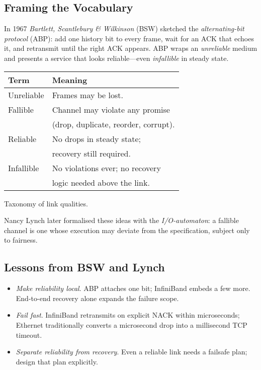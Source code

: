 \documentclass[../../../OAE-SPEC-MAIN.tex]{subfiles}
\begin{document}


\subsection{Framing the Vocabulary}

In 1967 \emph{Bartlett, Scantlebury \& Wilkinson} (BSW) sketched the
\emph{alternating-bit protocol} (ABP): add one history bit to every frame,
wait for an ACK that echoes it, and retransmit until the right ACK appears.
ABP wraps an \emph{unreliable} medium and presents a service that looks
reliable---even \emph{infallible} in steady state.

\begin{marginfigure}
  \footnotesize
  \centering
  \begin{tabular}{@{}l@{~}l@{}}
    \toprule
    Term & Meaning\\
    \midrule
    Unreliable & Frames may be lost.\\
    Fallible   & Channel may violate any promise\\
               & (drop, duplicate, reorder, corrupt).\\
    Reliable   & No drops in steady state;\\
               & recovery still required.\\
    Infallible & No violations ever; no recovery\\
               & logic needed above the link.\\
    \bottomrule
  \end{tabular}
  \caption{Taxonomy of link qualities.\label{tab:taxonomy}}
\end{marginfigure}

Nancy Lynch later formalised these ideas with the
\emph{I/O-automaton}: a fallible channel is one whose execution may
deviate from the specification, subject only to fairness.


\subsection{Lessons from BSW and Lynch}

\begin{itemize}
\item \emph{Make reliability local}.  ABP attaches one bit; InfiniBand embeds
      a few more.  End-to-end recovery alone expands the failure scope.
\item \emph{Fail fast}.  InfiniBand retransmits on explicit NACK within
      microseconds; Ethernet traditionally converts a microsecond drop into a
      millisecond TCP timeout.
\item \emph{Separate reliability from recovery}.  Even a reliable link needs
      a failsafe plan; design that plan explicitly.
\end{itemize}
\end{document}
